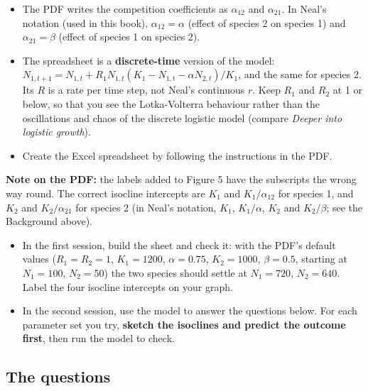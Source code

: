 \documentclass[
  a4paper]{book}
\providecommand{\tightlist}{%
  \setlength{\itemsep}{0pt}\setlength{\parskip}{0pt}}
\begin{document}
\begin{itemize}
\tightlist
\item
  The PDF writes the competition coefficients as \(\alpha_{12}\) and \(\alpha_{21}\). In Neal's notation (used in this book), \(\alpha_{12} = \alpha\) (effect of species 2 on species 1) and \(\alpha_{21} = \beta\) (effect of species 1 on species 2).
\item
  The spreadsheet is a \textbf{discrete-time} version of the model: \(N_{1,t+1} = N_{1,t} + R_1 N_{1,t}(K_1 - N_{1,t} - \alpha N_{2,t})/K_1\), and the same for species 2. Its \(R\) is a rate per time step, not Neal's continuous \(r\). Keep \(R_1\) and \(R_2\) at 1 or below, so that you see the Lotka-Volterra behaviour rather than the oscillations and chaos of the discrete logistic model (compare \emph{Deeper into logistic growth}).
\end{itemize}

\begin{itemize}
\tightlist
\item
  Create the Excel spreadsheet by following the instructions in the PDF.
\end{itemize}

\textbf{Note on the PDF:} the labels added to Figure 5 have the subscripts the wrong way round. The correct isocline intercepts are \(K_1\) and \(K_1/\alpha_{12}\) for species 1, and \(K_2\) and \(K_2/\alpha_{21}\) for species 2 (in Neal's notation, \(K_1\), \(K_1/\alpha\), \(K_2\) and \(K_2/\beta\); see the Background above).

\begin{itemize}
\tightlist
\item
  In the first session, build the sheet and check it: with the PDF's default values (\(R_1 = R_2 = 1\), \(K_1 = 1200\), \(\alpha = 0.75\), \(K_2 = 1000\), \(\beta = 0.5\), starting at \(N_1 = 100\), \(N_2 = 50\)) the two species should settle at \(N_1 = 720\), \(N_2 = 640\). Label the four isocline intercepts on your graph.
\item
  In the second session, use the model to answer the questions below. For each parameter set you try, \textbf{sketch the isoclines and predict the outcome first}, then run the model to check.
\end{itemize}

\subsection{The questions}\label{the-questions}
\end{document}

